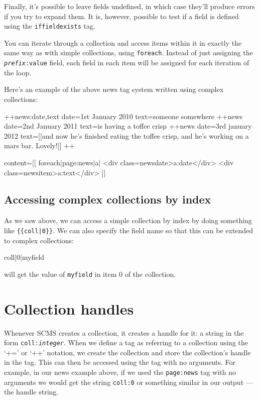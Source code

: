Finally, it's possible to leave fields undefined, in which case they'll
produce errors if you try to expand them. It is, however, possible to
test if a field is defined using the \texttt{iffieldexists} tag.

You can iterate through a collection and access items within it in exactly the same
way as with simple collections, using \texttt{foreach}. Instead of just
assigning the \texttt{\emph{prefix}:value} field, each field in each item will be assigned 
for each iteration of the loop.

\clearpage
Here's an example of the above news tag system written using complex collections:
\begin{MyVerbatim}
++news:date,text
date=1st January 2010
text=someone somewhere
++news
date=2nd January 2011
text=is having a toffee crisp
++news
date=3rd january 2012
text=[[and now he's finished eating the toffee crisp,
and he's working on a mars bar. Lovely!]]
++

content=[[
    {{foreach|{{page:news}}|a|
        <div class=newsdate>{{a:date}}</div>
        <div class=newsitem>{{a:text}}</div>
    }}
]]
\end{MyVerbatim}

\subsection{Accessing complex collections by index}
\label{collbyindex2}
As we saw above, we can access a simple collection by index by doing something like \verb,{{coll|0}},.
We can also specify the field name so that this can be extended to complex collections:
\begin{MyVerbatim}
{{coll|0|myfield}}
\end{MyVerbatim}
will get the value of \texttt{myfield} in item 0 of the collection.

\section{Collection handles}
Whenever SCMS creates a collection, it creates a handle for it:
a string in the form \texttt{coll:\emph{integer}}. When we define a tag as
referring to a collection using the `+=' or `++' notation, we create the collection
and store the collection's handle in the tag. This can then be accessed
using the tag with no arguments. For example, in our news example above, if 
we used the \texttt{page:news} tag with no arguments we would get the string
\texttt{{coll:0}} or something similar in our output --- the handle string.


